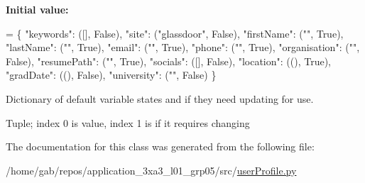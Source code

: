{\bfseries Initial value\+:}
\begin{DoxyCode}
=  \{
            \textcolor{stringliteral}{"keywords"}: ([], \textcolor{keyword}{False}),
            \textcolor{stringliteral}{"site"}: (\textcolor{stringliteral}{"glassdoor"}, \textcolor{keyword}{False}),
            \textcolor{stringliteral}{"firstName"}: (\textcolor{stringliteral}{""}, \textcolor{keyword}{True}),
            \textcolor{stringliteral}{"lastName"}: (\textcolor{stringliteral}{""}, \textcolor{keyword}{True}),
            \textcolor{stringliteral}{"email"}: (\textcolor{stringliteral}{""}, \textcolor{keyword}{True}),
            \textcolor{stringliteral}{"phone"}: (\textcolor{stringliteral}{""}, \textcolor{keyword}{True}),
            \textcolor{stringliteral}{"organisation"}: (\textcolor{stringliteral}{""}, \textcolor{keyword}{False}),
            \textcolor{stringliteral}{"resumePath"}: (\textcolor{stringliteral}{""}, \textcolor{keyword}{True}),
            \textcolor{stringliteral}{"socials"}: ([], \textcolor{keyword}{False}),
            \textcolor{stringliteral}{"location"}: ((), \textcolor{keyword}{True}),
            \textcolor{stringliteral}{"gradDate"}: ((), \textcolor{keyword}{False}),
            \textcolor{stringliteral}{"university"}: (\textcolor{stringliteral}{""}, \textcolor{keyword}{False})
        \}
\end{DoxyCode}


Dictionary of default variable states and if they need updating for use. 

Tuple; index 0 is value, index 1 is if it requires changing 

The documentation for this class was generated from the following file\+:\begin{DoxyCompactItemize}
\item 
/home/gab/repos/application\+\_\+3xa3\+\_\+l01\+\_\+grp05/src/\hyperlink{userProfile_8py}{user\+Profile.\+py}\end{DoxyCompactItemize}
